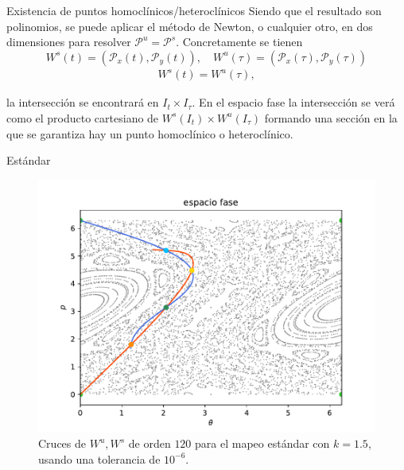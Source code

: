 \documentclass[11pt]{beamer}
\theoremstyle{definition}
\begin{document}
\begin{frame}{Existencia de puntos homocl\'inicos/heterocl\'inicos}
Siendo que el resultado son polinomios, se puede aplicar el método de Newton, o cualquier otro, en dos dimensiones para resolver $\mathcal{P}^{u}=\mathcal{P}^{s}$.
Concretamente se tienen \\
\begin{equation}
W^{s}(t)=(\mathcal{P}_{x}(t),\mathcal{P}_{y}(t)) ,\quad W^{u}(\tau)=(\mathcal{P}_{x}(\tau),\mathcal{P}_{y}(\tau))
\end{equation}
\begin{eqnarray}
W^{s}(t)=W^{u}(\tau),
\end{eqnarray}

la intersección se encontrará en $I_{t}\times I_{\tau}$. En el espacio fase la intersección se verá como el producto cartesiano de $W^{s}(I_{t})\times W^{u}(I_{\tau})$ formando una sección en la que se garantiza hay un punto homoclínico o heteroclínico. 
\end{frame}
\begin{frame}{Est\'andar}
\begin{figure}
\centering
\includegraphics[scale=0.5]{cruce_estandar}
\caption{Cruces de $W^{u},W^{s}$ de orden $120$ para el mapeo estándar con $k=1.5$, usando una tolerancia de $10^{-6}$.}
\label{cruce_estandar}
\end{figure}

\end{frame}
\end{document}
